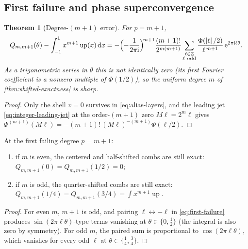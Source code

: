 \documentclass[11pt,oneside]{article}
\numberwithin{equation}{section}
\newtheorem{theorem}{Theorem}[section]
\theoremstyle{definition}
\theoremstyle{remark}
\newcommand{\Z}{\mathbb Z}
\newcommand{\dd}{\,\mathrm d}
\newcommand{\e}{\mathrm e}
\newcommand{\ii}{\mathrm i}
\newcommand{\Up}{\operatorname{up}}
\newcommand{\abs}[1]{\left\lvert #1\right\rvert}
\begin{document}
\subsection{First failure and phase superconvergence}

\begin{theorem}[Degree-$(m{+}1)$ error]
\label{thm:first-failure}
For $p=m+1$,
\begin{equation}
 Q_{m,m+1}(\theta)-\int_{-1}^{1}x^{m+1}\Up(x)\dd x
 =-\Bigl(-\frac{1}{2\pi\ii}\Bigr)^{\!m+1}
 \frac{(m+1)!}{2^{m(m+1)}}
 \sum_{\substack{\ell\in\Z\\ \ell\ \mathrm{odd}}}
 \frac{\Phi(\abs\ell/2)}{\ell^{\,m+1}}\,
 \e^{2\pi\ii\ell\theta}.
 \label{eq:first-failure}
\end{equation}
As a trigonometric series in $\theta$ this is not identically zero
(its first Fourier coefficient is a nonzero multiple of
$\Phi(1/2)$), so the uniform degree $m$ of
\cref{thm:shifted-exactness} is sharp.
\end{theorem}

\begin{proof}
Only the shell $v=0$ survives in \eqref{eq:alias-layers}, and the
leading jet \eqref{eq:integer-leading-jet} at the order-$(m{+}1)$ zero
$M\ell=2^{m}\ell$ gives
$\Phi^{(m+1)}(M\ell)=-(m+1)!\,(M\ell)^{-(m+1)}\Phi(\ell/2)$.
\end{proof}

\begin{corollary}
\label{cor:phase-super}
At the first failing degree $p=m+1$:
\begin{enumerate}
\item if $m$ is even, the centered and half-shifted combs are still
exact: $Q_{m,m+1}(0)=Q_{m,m+1}(1/2)=0$;
\item if $m$ is odd, the quarter-shifted combs are still exact:
$Q_{m,m+1}(1/4)=Q_{m,m+1}(3/4)
=\int x^{m+1}\Up$.
\end{enumerate}
\end{corollary}

\begin{proof}
For even $m$, $m+1$ is odd, and pairing $\ell\leftrightarrow-\ell$ in
\eqref{eq:first-failure} produces $\sin(2\pi\ell\theta)$-type terms
vanishing at $\theta\in\{0,\tfrac12\}$ (the integral is also zero by
symmetry).  For odd $m$, the paired sum is proportional to
$\cos(2\pi\ell\theta)$, which vanishes for every odd $\ell$ at
$\theta\in\{\tfrac14,\tfrac34\}$.
\end{proof}
\end{document}
